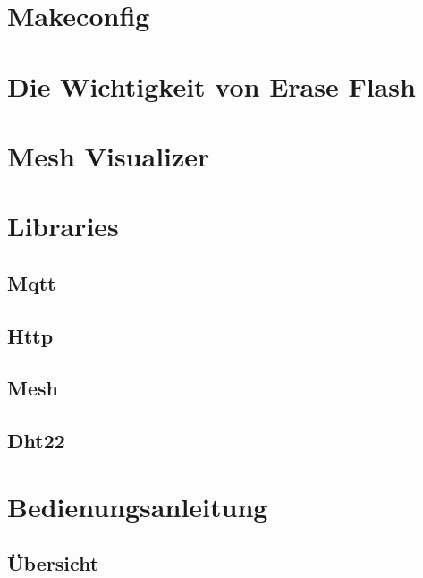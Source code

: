 \section{Makeconfig}

\section{Die Wichtigkeit von Erase Flash}

\section{Mesh Visualizer}\label{sec:mesh-visualizer}

\section{Libraries}

\subsection{Mqtt}
\subsection{Http}
\subsection{Mesh}
\subsection{Dht22}

\section{Bedienungsanleitung}

\subsection{Übersicht}

